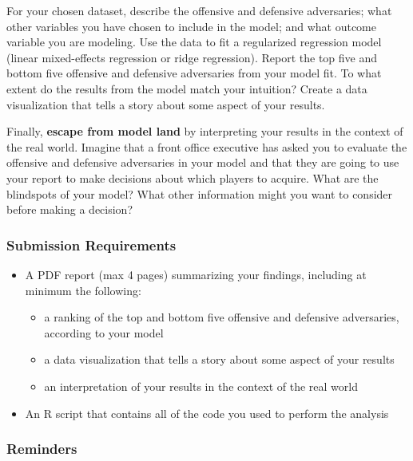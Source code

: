 \documentclass{article}
\begin{document}
      For your chosen dataset, describe the offensive and defensive adversaries; what other variables you have chosen to include in the model; and what outcome variable you are modeling. Use the data to fit a regularized regression model (linear mixed-effects regression or ridge regression). Report the top five and bottom five offensive and defensive adversaries from your model fit. To what extent do the results from the model match your intuition? Create a data visualization that tells a story about some aspect of your results.

      Finally, {\bf escape from model land} by interpreting your results in the context of the real world. Imagine that a front office executive has asked you to evaluate the offensive and defensive adversaries in your model and that they are going to use your report to make decisions about which players to acquire. What are the blindspots of your model? What other information might you want to consider before making a decision?

      \subsubsection*{\sc Submission Requirements}

        \begin{itemize}
          \item A PDF report (max 4 pages) summarizing your findings, including at minimum the following:
          \begin{itemize}
            \item a ranking of the top and bottom five offensive and defensive adversaries, according to your model
            \item a data visualization that tells a story about some aspect of your results
            \item an interpretation of your results in the context of the real world
          \end{itemize}
          \item An R script that contains all of the code you used to perform the analysis
        \end{itemize}

      \subsubsection*{\sc Reminders}
\end{document}
